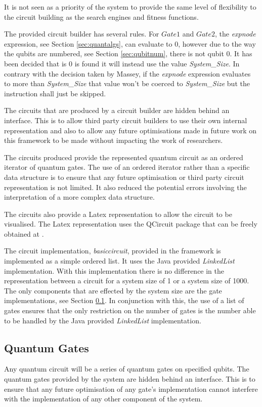 It is not seen as a priority of the system to provide the same level of flexibility to the circuit building as the search engines and fitness functions.

The provided circuit builder has several rules.
For $Gate1$ and $Gate2$, the \emph{expnode} expression, see Section \ref{sec:quantalgs}, can evaluate to $0$, however due to the way the qubits are numbered, see Section \ref{sec:qubitnum}, there is not qubit $0$.
It has been decided that is $0$ is found it will instead use the value \emph{System\_Size}.
In contrary with the decision taken by Massey\cite{masseythesis}, if the \emph{expnode} expression evaluates to more than \emph{System\_Size} that value won't be coerced to \emph{System\_Size} but the instruction shall just be skipped.

The circuits that are produced by a circuit builder are hidden behind an interface.
This is to allow third party circuit builders to use their own internal representation and also to allow any future optimisations made in future work on this framework to be made without impacting the work of researchers.

The circuits produced provide the represented quantum circuit as an ordered iterator of quantum gates.
The use of an ordered iterator rather than a specific data structure is to ensure that any future optimisation or third party circuit representation is not limited.
It also reduced the potential errors involving the interpretation of a more complex data structure.

The circuits also provide a Latex representation to allow the circuit to be visualised.
The Latex representation uses the QCircuit package that can be freely obtained at \cite{QCsite}.

The circuit implementation, \emph{basiccircuit}, provided in the framework is implemented as a simple ordered list.
It uses the Java provided \emph{LinkedList} implementation.
With this implementation there is no difference in the representation between a circuit for a system size of 1 or a system size of 1000.
The only components that are effected by the system size are the gate implementations, see Section \ref{sec:quantumgates}.
In conjunction with this, the use of a list of gates ensures that the only restriction on the number of gates is the number able to be handled by the Java provided \emph{LinkedList} implementation.

\subsection{Quantum Gates}
\label{sec:quantumgates}
Any quantum circuit will be a series of quantum gates on specified qubits.
The quantum gates provided by the system are hidden behind an interface.
This is to ensure that any future optimisation of any gate's implementation cannot interfere with the implementation of any other component of the system.


